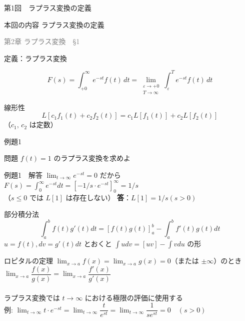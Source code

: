\documentclass[professionalfonts]{beamer}
\begin{document}
\begin{frame}{第1回　ラプラス変換の定義}
  \begin{block}{本回の内容}
  ラプラス変換の定義
  \end{block}
  \vfill\hfill{\scriptsize \textcolor{gray}{第2章 ラプラス変換　§1}}
\end{frame}

\begin{frame}{定義：ラプラス変換}
  \begin{block}{}
  \[
    F(s) = \int_{+0}^{\infty} e^{-st} f(t)\,dt = \lim_{\substack{\varepsilon \to +0 \\ T \to \infty}} \int_{\varepsilon}^{T} e^{-st} f(t)\,dt
  \]
  \end{block}
\end{frame}

\begin{frame}{線形性}
  \[
    L[c_{1}f_{1}(t) + c_{2}f_{2}(t)] = c_{1}L[f_{1}(t)] + c_{2}L[f_{2}(t)]
  \]
  {\small （$c_1,\, c_2$ は定数）}
\end{frame}

\begin{frame}{例題1}
  \begin{exampleblock}{問題}
    $f(t) = 1$ のラプラス変換を求めよ\\[2pt]
  \end{exampleblock}
\end{frame}

\begin{frame}{例題1　解答}
  $\lim_{t \to \infty} e^{-st} = 0$ だから\\[4pt]
  $F(s) = \int_{0}^\infty e^{-st} dt = [-1/s \cdot e^{-st}]_{0}^\infty = 1/s$\\[4pt]
  （$s \leq 0$ では $L[1]$ は存在しない）
  \medskip\textbf{答}：$L[1] = 1/s  (s > 0)$
\end{frame}

\begin{frame}{部分積分法}
  \[
    \int_a^b f(t)g'(t) dt = [f(t)g(t)]_a^b - \int_a^b f'(t)g(t) dt
  \]
  {\small $u = f(t), dv = g'(t)dt$ とおくと $\int u dv = [uv] - \int v du$ の形}
\end{frame}

\begin{frame}{ロピタルの定理}
  $\lim_{x\to a} f(x) = \lim_{x\to a} g(x) = 0$（または $\pm\infty$）のとき\\[2pt]
  $\lim_{x\to a} \dfrac{f(x)}{g(x)} = \lim_{x\to a} \dfrac{f'(x)}{g'(x)}$\\[2pt]
  \\[2pt]
  {\small ラプラス変換では $t \to \infty$ における極限の評価に使用する}\\[1pt]
  {\small 例: $\lim_{t\to\infty} t \cdot e^{-st} = \lim_{t\to\infty} \dfrac{t}{e^{st}} = \lim_{t\to\infty} \dfrac{1}{s e^{st}} = 0 \quad (s > 0)$}\\[1pt]
\end{frame}
\end{document}
